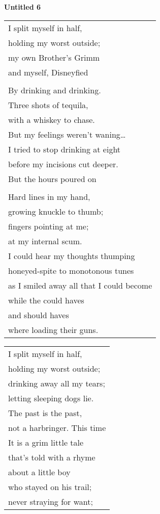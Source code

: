 \documentclass{article}
\begin{document}
\begin{center}
\textbf{Untitled 6} \\
\vspace*{2ex}
\begin{tabular}{l}
I split myself in half, \\
holding my worst outside; \\
my own Brother's Grimm \\
and myself, Disneyfied \\
\\
By drinking and drinking. \\
Three shots of tequila, \\
with a whiskey to chase. \\
But my feelings weren't waning\dots \\
I tried to stop drinking at eight \\
before my incisions cut deeper. \\
But the hours poured on \\
\\
Hard lines in my hand, \\
growing knuckle to thumb; \\
fingers pointing at me; \\
at my internal scum. \\
I could hear my thoughts thumping \\
honeyed-spite to monotonous tunes \\
as I smiled away all that I could become \\
while the could haves \\
and should haves \\
where loading their guns. \\
\end{tabular}
\begin{tabular}{l}
I split myself in half, \\
holding my worst outside; \\
drinking away all my tears; \\
letting sleeping dogs lie. \\
The past is the past, \\
not a harbringer.  This time \\
It is a grim little tale \\
that's told with a rhyme \\
about a little boy \\
who stayed on his trail; \\
never straying for want; \\

\end{tabular}
\end{center}
\end{document}
